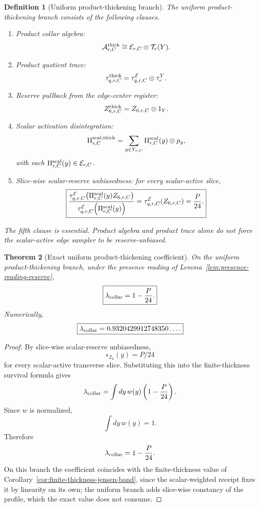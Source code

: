 \documentclass[11pt]{article}
\newtheorem{theorem}{Theorem}[section]
\newtheorem{definition}[theorem]{Definition}
\theoremstyle{remark}
\theoremstyle{plain}
\begin{document}
\begin{definition}[Uniform product-thickening branch]
\label{def:uniform-product-thickening-branch}
The uniform product-thickening branch consists of the following clauses.

\begin{enumerate}[leftmargin=2em]
\item Product collar algebra:
\[
\mathcal A^{\rm thick}_{r,C}
\cong
\mathcal E_{r,C}\otimes\mathcal T_r(Y).
\]

\item Product quotient trace:
\[
\tau^{\rm thick}_{q,r,C}
=
\tau^{\mathcal E}_{q,r,C}\otimes\tau^Y_r.
\]

\item Reserve pullback from the edge-center register:
\[
Z^{\rm thick}_{6,r,C}
=
Z_{6,r,C}\otimes1_Y.
\]

\item Scalar activation disintegration:
\[
\Pi^{\rm scal,thick}_{r,C}
=
\sum_{y\in Y_{r,C}}
\Pi^{\rm scal}_{r,C}(y)\otimes p_y,
\]
with each \(\Pi^{\rm scal}_{r,C}(y)\in\mathcal E_{r,C}\).

\item Slice-wise scalar-reserve unbiasedness: for every scalar-active slice,
\[
\boxed{
\frac{
\tau^{\mathcal E}_{q,r,C}
\!\left(\Pi^{\rm scal}_{r,C}(y)Z_{6,r,C}\right)
}{
\tau^{\mathcal E}_{q,r,C}
\!\left(\Pi^{\rm scal}_{r,C}(y)\right)
}
=
\tau^{\mathcal E}_{q,r,C}(Z_{6,r,C})
=
\frac{P}{24}.
}
\]
\end{enumerate}

The fifth clause is essential. Product algebra and product trace alone do not
force the scalar-active edge sampler to be reserve-unbiased.
\end{definition}

\begin{theorem}[Exact uniform product-thickening coefficient]
\label{thm:exact-uniform-product-thickening-coefficient}
On the uniform product-thickening branch, under the presence reading of
Lemma~\ref{lem:presence-reading-reserve},
\[
\boxed{
\lambda_{\rm collar}=1-\frac{P}{24}.
}
\]
Numerically,
\[
\boxed{
\lambda_{\rm collar}
=
0.9320429912748350\ldots .
}
\]
\end{theorem}

\begin{proof}
By slice-wise scalar-reserve unbiasedness,
\[
\epsilon_{\mathbb Z_6}(y)=P/24
\]
for every scalar-active transverse slice. Substituting this into the
finite-thickness survival formula gives
\[
\lambda_{\rm collar}
=
\int dy\,w(y)\left(1-\frac{P}{24}\right).
\]
Since \(w\) is normalized,
\[
\int dy\,w(y)=1.
\]
Therefore
\[
\lambda_{\rm collar}=1-\frac{P}{24}.
\]
On this branch the coefficient coincides with the finite-thickness value of
Corollary~\ref{cor:finite-thickness-jensen-band}, since the scalar-weighted
receipt fixes it by linearity on its own; the uniform branch adds slice-wise
constancy of the profile, which the exact value does not consume.
\end{proof}
\end{document}
